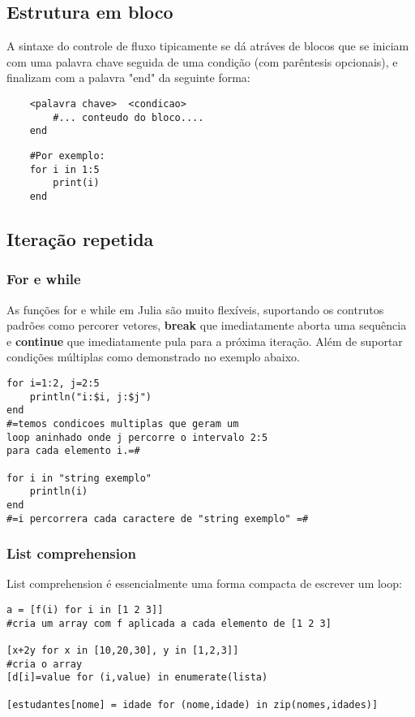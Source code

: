 \subsection{Estrutura em bloco}
A sintaxe do controle de fluxo tipicamente se dá atráves de blocos que se iniciam com uma palavra chave seguida de uma condição (com parêntesis opcionais), e finalizam com a palavra "end" da seguinte forma: 
    \begin{lstlisting}
    <palavra chave>  <condicao> 
        #... conteudo do bloco....
    end 
    \end{lstlisting}
    \begin{lstlisting}
    #Por exemplo:
    for i in 1:5
        print(i)
    end     
    \end{lstlisting}
\subsection{Iteração repetida}
\subsubsection{For e while}
As funções for e while em Julia são muito flexíveis, suportando os contrutos padrões como percorer vetores, \textbf{break} que imediatamente aborta uma sequência e \textbf{continue} que imediatamente pula para a próxima iteração. Além de suportar condições múltiplas como demonstrado no exemplo abaixo. 
\begin{lstlisting}
for i=1:2, j=2:5
	println("i:$i, j:$j")
end
#=temos condicoes multiplas que geram um 
loop aninhado onde j percorre o intervalo 2:5 
para cada elemento i.=#

for i in "string exemplo"
	println(i)
end 
#=i percorrera cada caractere de "string exemplo" =#
\end{lstlisting}
\subsubsection{List comprehension}
List comprehension é essencialmente uma forma compacta de escrever um loop:
\begin{lstlisting}
a = [f(i) for i in [1 2 3]] 
#cria um array com f aplicada a cada elemento de [1 2 3]

[x+2y for x in [10,20,30], y in [1,2,3]]
#cria o array 
[d[i]=value for (i,value) in enumerate(lista)

[estudantes[nome] = idade for (nome,idade) in zip(nomes,idades)]
\end{lstlisting}
